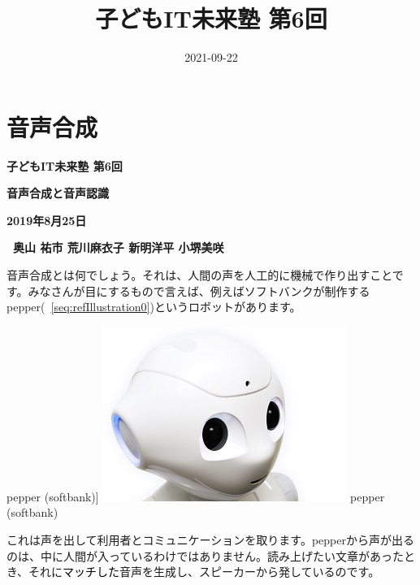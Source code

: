 \documentclass[a4paper,dvipdfmx]{jarticle}
\title{子どもIT未来塾 第6回}
\author{}
\date{2021-09-22}
\makeatletter
\newcommand\captionof[2]{\def\@captype{#1}\caption{#2}}
\makeatother
\begin{document}
\clearpage\setcounter{page}{1}\pagestyle{Standard}
\thispagestyle{FirstPage}

\bigskip

\clearpage\section{音声合成}
\centering
\begin{minipage}{17.369cm}
\clearpage\setcounter{page}{1}\pagestyle{Standard}
\thispagestyle{FirstPage}
{\centering\bfseries
子どもIT未来塾 第6回
\par}

{\centering\bfseries
音声合成と音声認識
\par}

{\centering\bfseries
2019年8月25日
\par}

{\centering\bfseries
\ 奥山 祐市\newline
荒川麻衣子\newline
新明洋平\newline
小堺美咲
\par}
\end{minipage}
{
音声合成とは何でしょう。それは、人間の声を人工的に機械で作り出すことです。みなさんが目にするもので言えば、例えばソフトバンクが制作するpepper(\figurename~\ref{seq:refIllustration0})というロボットがあります。}

\captionof{figure}[pepper (softbank)]{ \includegraphics[width=7.938cm,height=5.689cm]{text06-img/text06-img001.jpg}
\newline
pepper (softbank)}
\label{seq:refIllustration0}


{
これは声を出して利用者とコミュニケーションを取ります。pepperから声が出るのは、中に人間が入っているわけではありません。読み上げたい文章があったとき、それに\textcolor{black}{マッチした}音声を生成し、スピーカーから発しているのです。}
\end{document}

